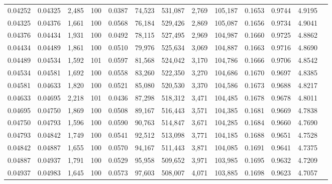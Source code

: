 \begin{tabular}{rrrrrrrrrrrrr}
0.04252 & 0.04325 & 2,485 & 100 &                                     0.0387 &  74,523 & 531,087 &   2,769 & 105,187 & 0.1653 & 0.9744 & 4.9195 \\
0.04325 & 0.04376 & 1,661 & 100 &                                     0.0568 &  76,184 & 529,426 &   2,869 & 105,087 & 0.1656 & 0.9734 & 4.9041 \\
0.04376 & 0.04434 & 1,931 & 100 &                                     0.0492 &  78,115 & 527,495 &   2,969 & 104,987 & 0.1660 & 0.9725 & 4.8862 \\
0.04434 & 0.04489 & 1,861 & 100 &                                     0.0510 &  79,976 & 525,634 &   3,069 & 104,887 & 0.1663 & 0.9716 & 4.8690 \\
0.04489 & 0.04534 & 1,592 & 101 &                                     0.0597 &  81,568 & 524,042 &   3,170 & 104,786 & 0.1666 & 0.9706 & 4.8542 \\
0.04534 & 0.04581 & 1,692 & 100 &                                     0.0558 &  83,260 & 522,350 &   3,270 & 104,686 & 0.1670 & 0.9697 & 4.8385 \\
0.04581 & 0.04633 & 1,820 & 100 &                                     0.0521 &  85,080 & 520,530 &   3,370 & 104,586 & 0.1673 & 0.9688 & 4.8217 \\
0.04633 & 0.04695 & 2,218 & 101 &                                     0.0436 &  87,298 & 518,312 &   3,471 & 104,485 & 0.1678 & 0.9678 & 4.8011 \\
0.04695 & 0.04750 & 1,869 & 100 &                                     0.0508 &  89,167 & 516,443 &   3,571 & 104,385 & 0.1681 & 0.9669 & 4.7838 \\
0.04750 & 0.04793 & 1,596 & 100 &                                     0.0590 &  90,763 & 514,847 &   3,671 & 104,285 & 0.1684 & 0.9660 & 4.7690 \\
0.04793 & 0.04842 & 1,749 & 100 &                                     0.0541 &  92,512 & 513,098 &   3,771 & 104,185 & 0.1688 & 0.9651 & 4.7528 \\
0.04842 & 0.04887 & 1,655 & 100 &                                     0.0570 &  94,167 & 511,443 &   3,871 & 104,085 & 0.1691 & 0.9641 & 4.7375 \\
0.04887 & 0.04937 & 1,791 & 100 &                                     0.0529 &  95,958 & 509,652 &   3,971 & 103,985 & 0.1695 & 0.9632 & 4.7209 \\
0.04937 & 0.04983 & 1,645 & 100 &                                     0.0573 &  97,603 & 508,007 &   4,071 & 103,885 & 0.1698 & 0.9623 & 4.7057 \\

\end{tabular}
